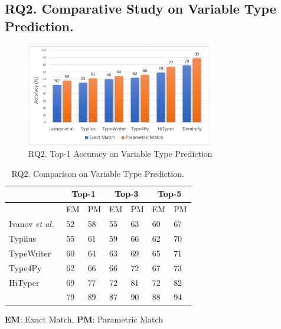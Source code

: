 \subsection{{\bf RQ2. Comparative Study on Variable Type Prediction.}}
\label{empirical-rq2}

\begin{figure}[thbp]
\begin{center}
\includegraphics[width=3.2in]{figures/type-prediction-result}
\vspace{-8pt}
\caption{RQ2. Top-1 Accuracy on Variable Type Prediction}
\label{type-prediction-result}
\end{center}
\end{figure}

\begin{table}[t]
  \caption{RQ2. Comparison on Variable Type Prediction.}
  \vspace{-5pt}
	\begin{center}
		\small
		\renewcommand{\arraystretch}{1} \begin{tabular}{|p{1.9cm}<{\centering}|p{0.65cm}<{\centering}|p{0.65cm}<{\centering}|p{0.65cm}<{\centering}|p{0.65cm}<{\centering}|p{0.65cm}<{\centering}|p{0.65cm}<{\centering}|}
			
			\hline
                       & \multicolumn{2}{c|}{Top-1}         & \multicolumn{2}{c|}{Top-3}         & \multicolumn{2}{c|}{Top-5} \\
			\hline
                       & EM & PM & EM & PM & EM & PM  \\ 
			\hline
		        Ivanov {\em et al.}~\cite{ivanov21predicting} &  52    & 58     &   55   &  63     &  60     &   67    \\
			Typilus~\cite{typilus-pldi20}  &   55   &  61    &  59    &   66   &  62    &  70     \\
			TypeWriter~\cite{typewriter-fse20}  &   60   &  64    &  63    &  69    &  65    & 71      \\
                       	Type4Py~\cite{Type4Py-icse22}  & 62 & 66 & 66 & 72 & 67 & 73 \\
                        HiTyper~\cite{HiTyper-icse22}  & 69 & 77 & 72 & 81 & 72 & 82 \\
			\hline
			{\bf {\tool}}                        & 79 & 89 & 87 & 90 & 88 & 94 \\
			\hline
		\end{tabular}
		\label{type-result}
		{\bf EM}: Exact Match, {\bf PM}: Parametric Match
	\end{center}
\end{table}

